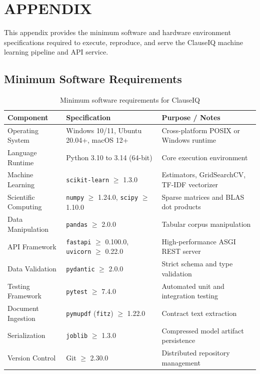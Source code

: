 \chapter{APPENDIX}
\label{ch:appendix}

This appendix provides the minimum software and hardware environment specifications required to execute, reproduce, and serve the ClauseIQ machine learning pipeline and API service.

\section{Minimum Software Requirements}
\label{sec:appendix_software}
\begin{table}[h!]
\centering
\small
\begin{tabular}{llp{7cm}}
\toprule
\textbf{Component} & \textbf{Specification} & \textbf{Purpose / Notes} \\
\midrule
Operating System & Windows 10/11, Ubuntu 20.04+, macOS 12+ & Cross-platform POSIX or Windows runtime \\
Language Runtime & Python 3.10 to 3.14 (64-bit) & Core execution environment \\
Machine Learning & \texttt{scikit-learn} $\ge$ 1.3.0 & Estimators, GridSearchCV, TF-IDF vectorizer \\
Scientific Computing & \texttt{numpy} $\ge$ 1.24.0, \texttt{scipy} $\ge$ 1.10.0 & Sparse matrices and BLAS dot products \\
Data Manipulation & \texttt{pandas} $\ge$ 2.0.0 & Tabular corpus manipulation \\
API Framework & \texttt{fastapi} $\ge$ 0.100.0, \texttt{uvicorn} $\ge$ 0.22.0 & High-performance ASGI REST server \\
Data Validation & \texttt{pydantic} $\ge$ 2.0.0 & Strict schema and type validation \\
Testing Framework & \texttt{pytest} $\ge$ 7.4.0 & Automated unit and integration testing \\
Document Ingestion & \texttt{pymupdf} (\texttt{fitz}) $\ge$ 1.22.0 & Contract text extraction \\
Serialization & \texttt{joblib} $\ge$ 1.3.0 & Compressed model artifact persistence \\
Version Control & Git $\ge$ 2.30.0 & Distributed repository management \\
\bottomrule
\end{tabular}
\caption{Minimum software requirements for ClauseIQ}
\label{tab:software_requirements}
\end{table}

